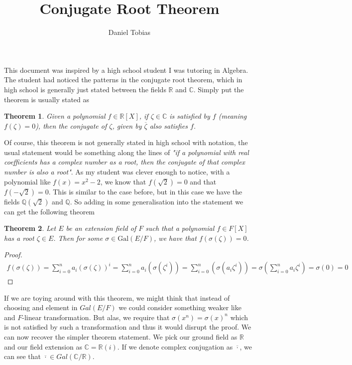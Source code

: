 \documentclass{article}
\title{Conjugate Root Theorem}
\author{Daniel Tobias}
\date{}
\newtheorem{theorem}{Theorem}
\begin{document}
\maketitle

This document was inspired by a high school student I was tutoring in Algebra. The student had noticed the patterns in the conjugate root theorem, which in high school is generally just stated between the fields $\mathbb{R}$ and $\mathbb{C}$. Simply put the theorem is usually stated as
\begin{theorem} Given a polynomial $f \in \mathbb{R}[X]$, if $\zeta \in \mathbb{C}$ is satisfied by $f$ (meaning $f(\zeta) = 0$), then the conjugate of $\zeta$, given by $\overline{\zeta}$ also satisfies $f$. 
\end{theorem} 
Of course, this theorem is not generally stated in high school with notation, the usual statement would be something along the lines of \textit{"if a polynomial with real coefficients has a complex number as a root, then the conjugate of that complex number is also a root"}. As my student was clever enough to notice, with a polynomial like $f(x) = x^2 - 2$, we know that $f(\sqrt{2}) = 0$ and that $f(-\sqrt{2})= 0$. This is similar to the case before, but in this case we have the fields $\mathbb{Q}(\sqrt{2})$ and $\mathbb{Q}$. So adding in some generalisation into the statement we can get the following theorem

\begin{theorem}
Let $E$ be an extension field of $F$ such that a polynomial $f \in F[X]$ has a root $\zeta \in E$. Then for some $\sigma \in \text{Gal}(E/F)$, we have that $f(\sigma(\zeta)) = 0$.
\end{theorem}



\begin{proof}
\begin{align*}
    f(\sigma(\zeta)) = \sum_{i=0}^{n}a_{i} (\sigma(\zeta))^{i} = \sum_{i=0}^{n}a_{i} (\sigma(\zeta^{i})) = \sum_{i=0}^{n} (\sigma(a_{i}\zeta^{i})) = \sigma \left ( \sum_{i=0}^{n}a_{i}\zeta^{i} \right ) = \sigma (0) = 0
\end{align*}
\end{proof}

If we are toying around with this theorem, we might think that instead of choosing and element in $Gal(E/F)$ we could consider something weaker like and $F$-linear transformation. But alas, we require that $\sigma(x^{n}) = \sigma(x)^{n}$ which is not satisfied by such a transformation and thus it would disrupt the proof. We can now recover the simpler theorem statement. We pick our ground field as $\mathbb{R}$ and our field extension as $\mathbb{C} = \mathbb{R}(i)$. If we denote complex conjugation as $\overline{\cdot}$, we can see that $\overline{\cdot} \in Gal(\mathbb{C}/\mathbb{R})$.
\end{document}

